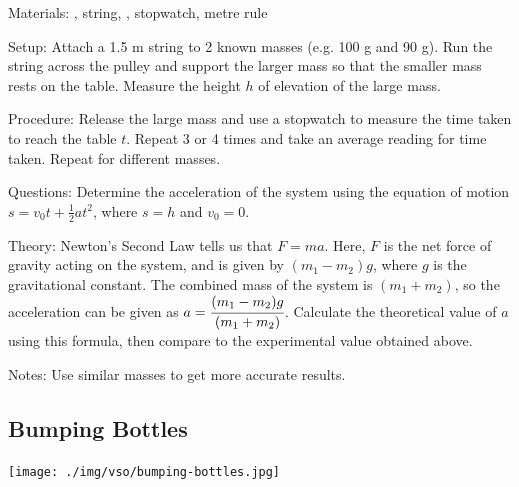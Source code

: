 \begin{multicols}{2}
\begin{description*}
\item[Materials:]{, string, , stopwatch, metre rule}
\item[Setup:]{Attach a 1.5 m string to 2 known masses (e.g. 100 g and 90 g). Run the string across the pulley and support the larger mass so that the smaller mass rests on the table. Measure the height $h$ of elevation of the large mass.}
\item[Procedure:]{Release the large mass and use a stopwatch to measure the time taken to reach the table $t$. Repeat 3 or 4 times and take an average reading for time taken. Repeat for different masses.}
\item[Questions:]{Determine the acceleration of the system using the equation of motion $s=v_0t+\frac{1}{2}at^2$, where $s=h$ and $v_0=0$.}
\item[Theory:]{Newton's Second Law tells us that $F=ma$. Here, $F$ is the net force of gravity acting on the system, and is given by $(m_1-m_2)g$, where $g$ is the gravitational constant. The combined mass of the system is $(m_1+m_2)$, so the acceleration can be given as $a=\cfrac{(m_1-m_2)g}{(m_1+m_2)}$. Calculate the theoretical value of $a$ using this formula, then compare to the experimental value obtained above.}
\item[Notes:]{Use similar masses to get more accurate results.}
\end{description*}

\subsection{Bumping Bottles}

\begin{center}
\texttt{[image: ./img/vso/bumping-bottles.jpg]}
\end{center}


\end{multicols}
